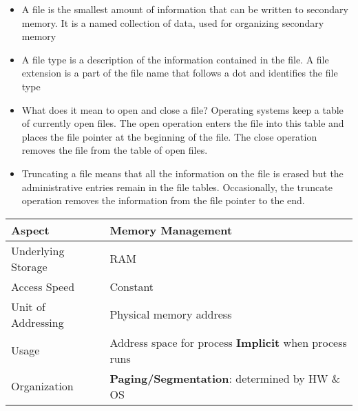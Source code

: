 \documentclass[8pt,twocolumn]{article}
\begin{document}
\begin{itemize}
    \setlength{\itemsep}{0pt} %
    \setlength{\parskip}{0pt}
    \item A file is the smallest amount of information that can be written to secondary memory.
    It is a named collection of data, used for organizing secondary memory
    \item A file type is a description of the information contained in the file. A file extension is
    a part of the file name that follows a dot and identifies the file type
    \item What does it mean to open and close a file?
Operating systems keep a table of currently open files. The open operation enters the
file into this table and places the file pointer at the beginning of the file. The close
operation removes the file from the table of open files.
    \item Truncating a file means that all the information on the file is erased but the
    administrative entries remain in the file tables. Occasionally, the truncate operation
    removes the information from the file pointer to the end.
\end{itemize}
\vspace{-1.6em}
\begin{table}[h!]
    \centering
    \renewcommand{\arraystretch}{0.6}
    \begin{tabular}{|l|p{6cm}|}
    \hline
    \textbf{Aspect} & \textbf{Memory Management} \\
    \hline
    Underlying Storage & RAM \\
    \hline
    Access Speed & Constant \\
    \hline
    Unit of Addressing & Physical memory address \\
    \hline
    Usage & Address space for process \newline \textbf{Implicit} when process runs \\
    \hline
    Organization & \textbf{Paging/Segmentation}: determined by HW \& OS \\
    \hline
    \end{tabular}
    \end{table}
\vspace{-1.5em}
\end{document}
